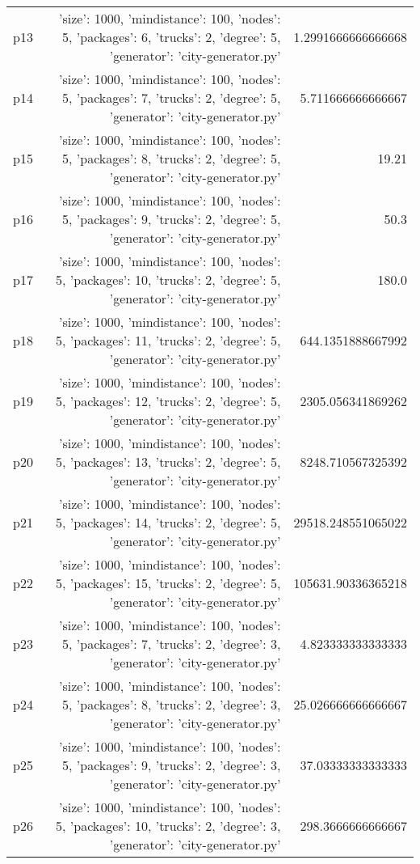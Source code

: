 \documentclass{article}
\begin{document}
\begin{center}
\begin{tabular}{r|r|r}
  p13&{'size': 1000, 'mindistance': 100, 'nodes': 5, 'packages': 6, 'trucks': 2, 'degree': 5, 'generator': 'city-generator.py'}&1.2991666666666668\\
  p14&{'size': 1000, 'mindistance': 100, 'nodes': 5, 'packages': 7, 'trucks': 2, 'degree': 5, 'generator': 'city-generator.py'}&5.711666666666667\\
  p15&{'size': 1000, 'mindistance': 100, 'nodes': 5, 'packages': 8, 'trucks': 2, 'degree': 5, 'generator': 'city-generator.py'}&19.21\\
  p16&{'size': 1000, 'mindistance': 100, 'nodes': 5, 'packages': 9, 'trucks': 2, 'degree': 5, 'generator': 'city-generator.py'}&50.3\\
  p17&{'size': 1000, 'mindistance': 100, 'nodes': 5, 'packages': 10, 'trucks': 2, 'degree': 5, 'generator': 'city-generator.py'}&180.0\\
  p18&{'size': 1000, 'mindistance': 100, 'nodes': 5, 'packages': 11, 'trucks': 2, 'degree': 5, 'generator': 'city-generator.py'}&644.1351888667992\\
  p19&{'size': 1000, 'mindistance': 100, 'nodes': 5, 'packages': 12, 'trucks': 2, 'degree': 5, 'generator': 'city-generator.py'}&2305.056341869262\\
  p20&{'size': 1000, 'mindistance': 100, 'nodes': 5, 'packages': 13, 'trucks': 2, 'degree': 5, 'generator': 'city-generator.py'}&8248.710567325392\\
  p21&{'size': 1000, 'mindistance': 100, 'nodes': 5, 'packages': 14, 'trucks': 2, 'degree': 5, 'generator': 'city-generator.py'}&29518.248551065022\\
  p22&{'size': 1000, 'mindistance': 100, 'nodes': 5, 'packages': 15, 'trucks': 2, 'degree': 5, 'generator': 'city-generator.py'}&105631.90336365218\\
  p23&{'size': 1000, 'mindistance': 100, 'nodes': 5, 'packages': 7, 'trucks': 2, 'degree': 3, 'generator': 'city-generator.py'}&4.823333333333333\\
  p24&{'size': 1000, 'mindistance': 100, 'nodes': 5, 'packages': 8, 'trucks': 2, 'degree': 3, 'generator': 'city-generator.py'}&25.026666666666667\\
  p25&{'size': 1000, 'mindistance': 100, 'nodes': 5, 'packages': 9, 'trucks': 2, 'degree': 3, 'generator': 'city-generator.py'}&37.03333333333333\\
  p26&{'size': 1000, 'mindistance': 100, 'nodes': 5, 'packages': 10, 'trucks': 2, 'degree': 3, 'generator': 'city-generator.py'}&298.3666666666667\\

\end{tabular}
\end{center}
\end{document}
